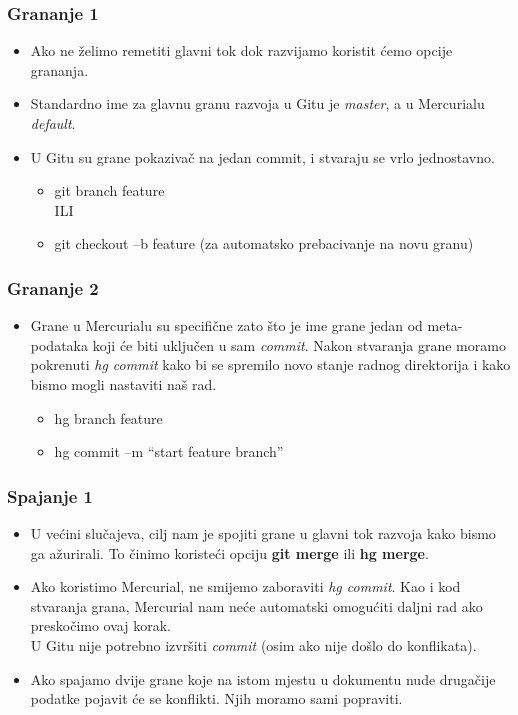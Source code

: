 \documentclass{beamer}
\begin{document}
	\begin{frame}
		\frametitle{Grananje 1}
		\begin{itemize}
			\item Ako ne želimo remetiti glavni tok dok razvijamo koristit ćemo opcije grananja.
			\item Standardno ime za glavnu granu razvoja u Gitu je \textit{master}, a u Mercurialu \textit{default}.
			\item U Gitu su grane pokazivač na jedan commit, i stvaraju se vrlo jednostavno.
			\begin{itemize}
				\item git branch feature
				 \\ILI
				\item git checkout –b feature (za automatsko prebacivanje na novu granu)
			\end{itemize}
		\end{itemize}
	\end{frame}
 
	\begin{frame}
		\frametitle{Grananje 2}
		\begin{itemize}
			\item Grane u Mercurialu su specifične zato što je ime grane jedan od meta-podataka koji će biti uključen u sam \textit{commit}. Nakon stvaranja grane moramo pokrenuti \textit{hg commit} kako bi se spremilo novo stanje radnog direktorija i kako bismo mogli nastaviti naš rad.
			\begin{itemize}
				\item hg branch feature
				\item hg commit –m “start feature branch”
			\end{itemize}
		\end{itemize}
	\end{frame}

	\begin{frame}
		\frametitle{Spajanje 1}
		\begin{itemize}
			\item U većini slučajeva, cilj nam je spojiti grane u glavni tok razvoja kako bismo ga ažurirali. To činimo koristeći opciju \textbf{git merge} ili \textbf{hg merge}.
			\item Ako koristimo Mercurial, ne smijemo zaboraviti \textit{hg commit}. Kao i kod stvaranja grana, Mercurial nam neće automatski omogućiti daljni rad ako preskočimo ovaj korak. \\ U Gitu nije potrebno izvršiti \textit{commit} (osim ako nije došlo do konflikata).
			\item Ako spajamo dvije grane koje na istom mjestu u dokumentu nude drugačije podatke pojavit će se konflikti. Njih moramo sami popraviti.
		\end{itemize}
	\end{frame}
\end{document}
